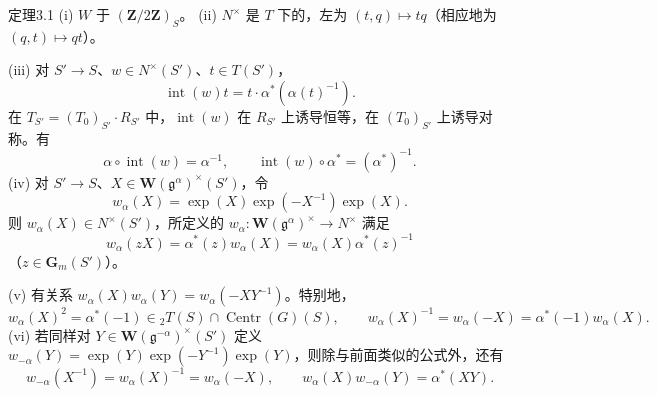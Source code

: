 \begin{SGAresult}{定理}{3.1}
(i) $W$ 于 $(\mathbf Z/2\mathbf Z)_S$。
(ii) $N^\times$ 是 $T$ 下的，左为 $(t,q)\mapsto tq$（相应地为 $(q,t)\mapsto qt$）。

(iii) 对 $S'\to S$、$w\in N^\times(S')$、$t\in T(S')$，
\[\operatorname{int}(w)t=t\cdot\alpha^*(\alpha(t)^{-1}).\]
在 $T_{S'}=(T_0)_{S'}\cdot R_{S'}$ 中，$\operatorname{int}(w)$ 在 $R_{S'}$ 上诱导恒等，在 $(T_0)_{S'}$ 上诱导对称。有
\[\alpha\circ\operatorname{int}(w)=\alpha^{-1},\qquad\operatorname{int}(w)\circ\alpha^*=(\alpha^*)^{-1}.\]
(iv) 对 $S'\to S$、$X\in\mathbf W(\mathfrak g^\alpha)^\times(S')$，令
\[w_\alpha(X)=\exp(X)\exp(-X^{-1})\exp(X).\]
则 $w_\alpha(X)\in N^\times(S')$，所定义的 $w_\alpha:\mathbf W(\mathfrak g^\alpha)^\times\to N^\times$ 满足
\[w_\alpha(zX)=\alpha^*(z)w_\alpha(X)=w_\alpha(X)\alpha^*(z)^{-1}\]
（$z\in\mathbf G_m(S')$）。

(v) 有关系 $w_\alpha(X)w_\alpha(Y)=w_\alpha(-XY^{-1})$。特别地，
\[w_\alpha(X)^2=\alpha^*(-1)\in{}_2T(S)\cap\operatorname{Centr}(G)(S),\qquad w_\alpha(X)^{-1}=w_\alpha(-X)=\alpha^*(-1)w_\alpha(X).\]
(vi) 若同样对 $Y\in\mathbf W(\mathfrak g^{-\alpha})^\times(S')$ 定义 $w_{-\alpha}(Y)=\exp(Y)\exp(-Y^{-1})\exp(Y)$，则除与前面类似的公式外，还有
\[w_{-\alpha}(X^{-1})=w_\alpha(X)^{-1}=w_\alpha(-X),\qquad w_\alpha(X)w_{-\alpha}(Y)=\alpha^*(XY).\]
\end{SGAresult}

